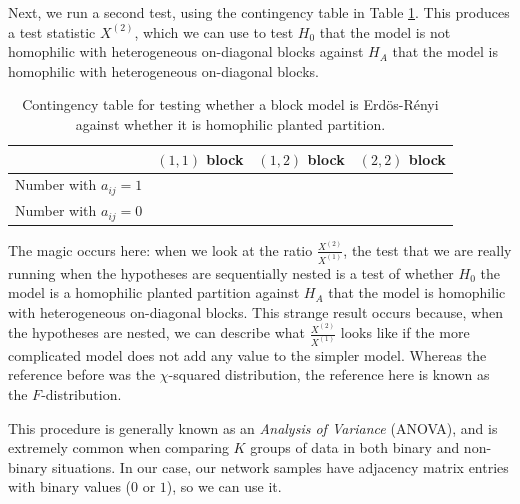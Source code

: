 \begin{lstlisting}[style=python]

\end{lstlisting}

Next, we run a second test, using the contingency table in Table \ref{tab:ch7:model:cont_het}. This produces a test statistic $X^{(2)}$, which we can use to test $H_0$ that the model is not homophilic with heterogeneous on-diagonal blocks against $H_A$ that the model is homophilic with heterogeneous on-diagonal blocks. 

\begin{table}[h]
    \centering
    \begin{tabular}{c|c|c|c}
         & $(1, 1)$ block & $(1, 2)$ block & $(2, 2)$ block \\
         \hline
         Number with $a_{ij} = 1$ & & & \\
         Number with $a_{ij} = 0$ & & & 
    \end{tabular}
    \caption{Contingency table for testing whether a block model is Erd\"os-R\'enyi against whether it is homophilic planted partition.}
    \label{tab:ch7:model:cont_het}
\end{table}

The magic occurs here: when we look at the ratio $\frac{X^{(2)}}{X^{(1)}}$, the test that we are really running when the hypotheses are sequentially nested is a test of whether $H_0$ the model is a homophilic planted partition against $H_A$ that the model is homophilic with heterogeneous on-diagonal blocks. This strange result occurs because, when the hypotheses are nested, we can describe what $\frac{X^{(2)}}{X^{(1)}}$ looks like if the more complicated model does not add any value to the simpler model. Whereas the reference before was the $\chi$-squared distribution, the reference here is known as the $F$-distribution. 

This procedure is generally known as an \textit{Analysis of Variance} (ANOVA), and is extremely common when comparing $K$ groups of data in both binary and non-binary situations. In our case, our network samples have adjacency matrix entries with binary values ($0$ or $1$), so we can use it.

\begin{lstlisting}[style=python]

\end{lstlisting}

\newpage